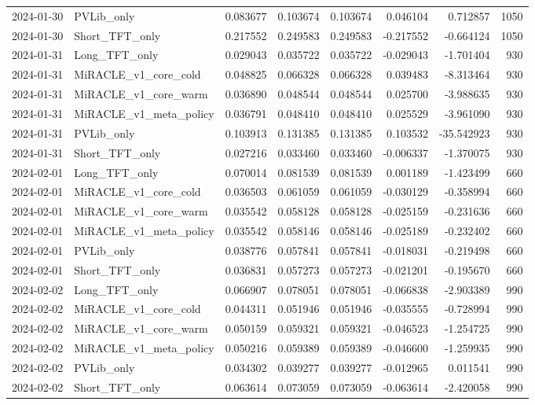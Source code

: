 \begin{tabular}{llrrrrrr}
2024-01-30 & PVLib_only & 0.083677 & 0.103674 & 0.103674 & 0.046104 & 0.712857 & 1050 \\
2024-01-30 & Short_TFT_only & 0.217552 & 0.249583 & 0.249583 & -0.217552 & -0.664124 & 1050 \\
2024-01-31 & Long_TFT_only & 0.029043 & 0.035722 & 0.035722 & -0.029043 & -1.701404 & 930 \\
2024-01-31 & MiRACLE_v1_core_cold & 0.048825 & 0.066328 & 0.066328 & 0.039483 & -8.313464 & 930 \\
2024-01-31 & MiRACLE_v1_core_warm & 0.036890 & 0.048544 & 0.048544 & 0.025700 & -3.988635 & 930 \\
2024-01-31 & MiRACLE_v1_meta_policy & 0.036791 & 0.048410 & 0.048410 & 0.025529 & -3.961090 & 930 \\
2024-01-31 & PVLib_only & 0.103913 & 0.131385 & 0.131385 & 0.103532 & -35.542923 & 930 \\
2024-01-31 & Short_TFT_only & 0.027216 & 0.033460 & 0.033460 & -0.006337 & -1.370075 & 930 \\
2024-02-01 & Long_TFT_only & 0.070014 & 0.081539 & 0.081539 & 0.001189 & -1.423499 & 660 \\
2024-02-01 & MiRACLE_v1_core_cold & 0.036503 & 0.061059 & 0.061059 & -0.030129 & -0.358994 & 660 \\
2024-02-01 & MiRACLE_v1_core_warm & 0.035542 & 0.058128 & 0.058128 & -0.025159 & -0.231636 & 660 \\
2024-02-01 & MiRACLE_v1_meta_policy & 0.035542 & 0.058146 & 0.058146 & -0.025189 & -0.232402 & 660 \\
2024-02-01 & PVLib_only & 0.038776 & 0.057841 & 0.057841 & -0.018031 & -0.219498 & 660 \\
2024-02-01 & Short_TFT_only & 0.036831 & 0.057273 & 0.057273 & -0.021201 & -0.195670 & 660 \\
2024-02-02 & Long_TFT_only & 0.066907 & 0.078051 & 0.078051 & -0.066838 & -2.903389 & 990 \\
2024-02-02 & MiRACLE_v1_core_cold & 0.044311 & 0.051946 & 0.051946 & -0.035555 & -0.728994 & 990 \\
2024-02-02 & MiRACLE_v1_core_warm & 0.050159 & 0.059321 & 0.059321 & -0.046523 & -1.254725 & 990 \\
2024-02-02 & MiRACLE_v1_meta_policy & 0.050216 & 0.059389 & 0.059389 & -0.046600 & -1.259935 & 990 \\
2024-02-02 & PVLib_only & 0.034302 & 0.039277 & 0.039277 & -0.012965 & 0.011541 & 990 \\
2024-02-02 & Short_TFT_only & 0.063614 & 0.073059 & 0.073059 & -0.063614 & -2.420058 & 990 \\

\end{tabular}
